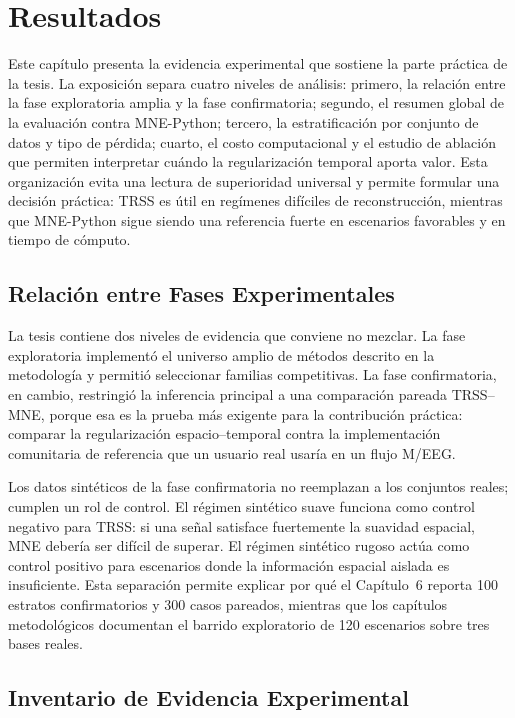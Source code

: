 \chapter{Resultados}
\label{ch:resultados}

Este capítulo presenta la evidencia experimental que sostiene la parte práctica de la tesis. La exposición separa cuatro niveles de análisis: primero, la relación entre la fase exploratoria amplia y la fase confirmatoria; segundo, el resumen global de la evaluación contra MNE-Python; tercero, la estratificación por conjunto de datos y tipo de pérdida; cuarto, el costo computacional y el estudio de ablación que permiten interpretar cuándo la regularización temporal aporta valor. Esta organización evita una lectura de superioridad universal y permite formular una decisión práctica: TRSS es útil en regímenes difíciles de reconstrucción, mientras que MNE-Python sigue siendo una referencia fuerte en escenarios favorables y en tiempo de cómputo.

\section{Relación entre Fases Experimentales}

La tesis contiene dos niveles de evidencia que conviene no mezclar. La fase exploratoria implementó el universo amplio de métodos descrito en la metodología y permitió seleccionar familias competitivas. La fase confirmatoria, en cambio, restringió la inferencia principal a una comparación pareada TRSS--MNE, porque esa es la prueba más exigente para la contribución práctica: comparar la regularización espacio--temporal contra la implementación comunitaria de referencia que un usuario real usaría en un flujo M/EEG.



Los datos sintéticos de la fase confirmatoria no reemplazan a los conjuntos reales; cumplen un rol de control. El régimen sintético suave funciona como control negativo para TRSS: si una señal satisface fuertemente la suavidad espacial, MNE debería ser difícil de superar. El régimen sintético rugoso actúa como control positivo para escenarios donde la información espacial aislada es insuficiente. Esta separación permite explicar por qué el Capítulo~6 reporta 100 estratos confirmatorios y 300 casos pareados, mientras que los capítulos metodológicos documentan el barrido exploratorio de 120 escenarios sobre tres bases reales.

\section{Inventario de Evidencia Experimental}

